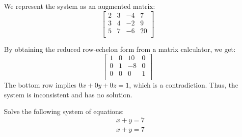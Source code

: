 \begin{solution}
    We represent the system as an augmented matrix:
    \[
        \left[
            \begin{array}{ccc|c}
                2 & 3 & -4 & 7  \\
                3 & 4 & -2 & 9  \\
                5 & 7 & -6 & 20 \\
            \end{array}
            \right]
    \]

    By obtaining the reduced row-echelon form from a matrix calculator, we get:
    \[
        \left[\begin{array}{ccc|c}
                1 & 0 & 10 & 0 \\
                0 & 1 & -8 & 0 \\
                0 & 0 & 0  & 1 \\
            \end{array}\right]
    \]
    The bottom row implies \( 0x + 0y + 0z = 1 \), which is a contradiction. Thus, the system is inconsistent and has no solution.
\end{solution}


\begin{example}
    Solve the following system of equations:
    \[
        \begin{aligned}
             & x + y = 7 \\
             & x + y = 7
        \end{aligned}
    \]
\end{example}

